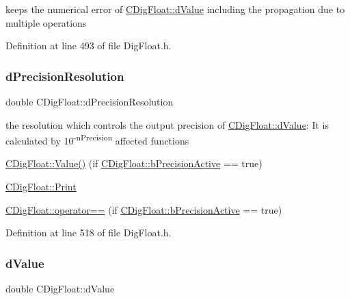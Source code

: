 keeps the numerical error of \hyperlink{classCDigFloat_a4bbe69e30dd4e20527362493aa9aaf96}{C\+Dig\+Float\+::d\+Value} including the propagation due to multiple operations 



Definition at line 493 of file Dig\+Float.\+h.

\mbox{\label{classCDigFloat_a7f9809fa0b25da57f5c8c18a02b7d1a7}} 
\subsubsection{\texorpdfstring{d\+Precision\+Resolution}{dPrecisionResolution}}
{\footnotesize\ttfamily double C\+Dig\+Float\+::d\+Precision\+Resolution\hspace{0.3cm}{\ttfamily [protected]}}



the resolution which controls the output precision of \hyperlink{classCDigFloat_a4bbe69e30dd4e20527362493aa9aaf96}{C\+Dig\+Float\+::d\+Value}\+: It is calculated by 10\textsuperscript{-\/n\+Precision} affected functions 


\begin{DoxyItemize}
\item \hyperlink{classCDigFloat_af74b8cd0935294b6371f551b7a1ff640}{C\+Dig\+Float\+::\+Value()} (if \hyperlink{classCDigFloat_aa1f6ed0312a2aa6ae5ee2abd195adefc}{C\+Dig\+Float\+::b\+Precision\+Active} == true)
\item \hyperlink{classCDigFloat_a80731e0970f607114d6d1bde4d02bd39}{C\+Dig\+Float\+::\+Print}
\item \hyperlink{classCDigFloat_ad8980d984bf2bab71d15b830fd0180a5}{C\+Dig\+Float\+::operator==} (if \hyperlink{classCDigFloat_aa1f6ed0312a2aa6ae5ee2abd195adefc}{C\+Dig\+Float\+::b\+Precision\+Active} == true) 
\end{DoxyItemize}

Definition at line 518 of file Dig\+Float.\+h.

\mbox{\label{classCDigFloat_a4bbe69e30dd4e20527362493aa9aaf96}} 
\subsubsection{\texorpdfstring{d\+Value}{dValue}}
{\footnotesize\ttfamily double C\+Dig\+Float\+::d\+Value\hspace{0.3cm}{\ttfamily [protected]}}



